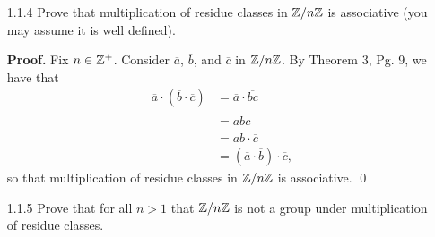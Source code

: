 \begin{enumerate}
      \textbf{Proof.} Fix $n \in \Z^+$. Consider $\overline{a}$, $\overline{b}$,
      and $\overline{c}$ in $\Z/n\Z$. By Theorem 3, Pg. 9, we have that
      \begin{align*}
         \overline{a} + (\overline{b} + \overline{c})
            &= \overline{a} + \overline{b + c} \\
            &= \overline{a + b + c} \\
            &= \overline{a + b} + \overline{c} \\
            &= (\overline{a} + \overline{b}) + \overline{c},
      \end{align*}
      so that addition of residue classes in $\Z/n\Z$ is associative. \qed
   \item[1.1.4]   Prove that multiplication of residue classes in $\Z/n\Z$ is
                  associative (you may assume it is well defined).
                  
      \textbf{Proof.} Fix $n \in \Z^+$. Consider $\overline{a}$, $\overline{b}$,
      and $\overline{c}$ in $\Z/n\Z$. By Theorem 3, Pg. 9, we have that
      \begin{align*}
         \overline{a} \cdot (\overline{b} \cdot \overline{c})
            &= \overline{a} \cdot \overline{bc} \\
            &= \overline{abc} \\
            &= \overline{ab} \cdot \overline{c} \\
            &= (\overline{a} \cdot \overline{b}) \cdot \overline{c},
      \end{align*}
      so that multiplication of residue classes in $\Z/n\Z$ is associative. \qed
   \item[1.1.5]   Prove that for all $n > 1$ that $\Z/n\Z$ is not a group under
                  multiplication of residue classes.
                  

\end{enumerate}
